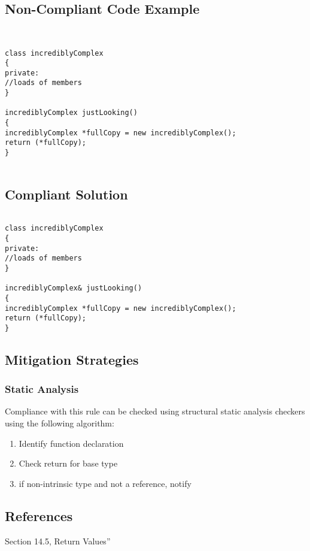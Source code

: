 \subsection{Non-Compliant Code Example}


\begin{verbatim}


class incrediblyComplex
{
private:
//loads of members
}

incrediblyComplex justLooking()
{
incrediblyComplex *fullCopy = new incrediblyComplex();
return (*fullCopy);
}


\end{verbatim}

\subsection{Compliant Solution}


\begin{verbatim}

class incrediblyComplex
{
private:
//loads of members
}

incrediblyComplex& justLooking()
{
incrediblyComplex *fullCopy = new incrediblyComplex();
return (*fullCopy);
}

\end{verbatim}

\subsection{Mitigation Strategies}
\subsubsection{Static Analysis} 

Compliance with this rule can be checked using structural static analysis checkers using the following algorithm:

\begin{enumerate}
\item Identify function declaration
\item Check return for base type
\item if non-intrinsic type and not a reference, notify
\end{enumerate}

\subsection{References}

 Section 14.5,
Return Values''